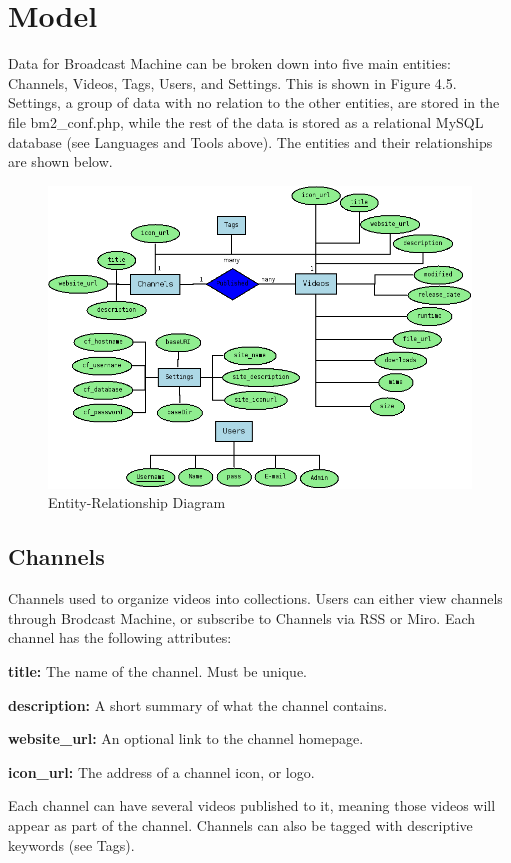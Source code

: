 \documentclass[a4paper,12pt]{report}
\begin{document}
\section{Model}
Data for Broadcast Machine can be broken down into five main entities: Channels, Videos, Tags, Users, and Settings. This is shown in Figure 4.5. Settings, a group of data with no relation to the other entities, are stored in the file bm2\_conf.php, while the rest of the data is stored as a relational MySQL database (see Languages and Tools above). The entities and their relationships are shown below.
\begin{figure}[htp]
\begin{center}
\includegraphics[scale=0.45]{./images/er.png}
\end{center}
\caption{Entity-Relationship Diagram}
\end{figure}

\subsection*{Channels}
Channels used to organize videos into collections. Users can either view channels through Brodcast Machine, or subscribe to Channels via RSS or Miro. Each channel has the following attributes:
\begin{description}
\item{\textbf{title: } The name of the channel. Must be unique.}
\item{\textbf{description: } A short summary of what the channel contains.}
\item{\textbf{website\_url: } An optional link to the channel homepage.}
\item{\textbf{icon\_url: } The address of a channel icon, or logo.} \\
\end{description}
Each channel can have several videos published to it, meaning those videos will appear as part of the channel. Channels can also be tagged with descriptive keywords (see Tags).
\end{document}
